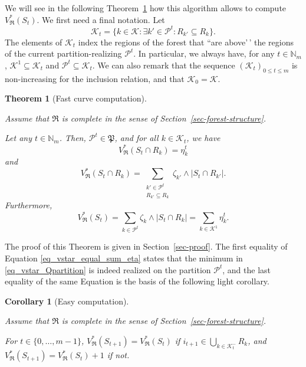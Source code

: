 \documentclass[
  11pt,
  a4paper,
]{article}
\theoremstyle{plain}
\newtheorem{corollary}{Corollary}[section]
\theoremstyle{definition}
\theoremstyle{plain}
\newtheorem{theorem}{Theorem}[section]
\theoremstyle{definition}
\theoremstyle{plain}
\theoremstyle{remark}
\begin{document}
We will see in the following Theorem~\ref{thm-curve-path} how this
algorithm allows to compute \(V^*_{\mathfrak{R}}(S_t)\). We first need a
final notation. Let \begin{equation*}
\mathcal{K}_t=\{k\in\mathcal{K}: \exists k'\in \mathcal{P}^t : R_{k'}\subseteq R_k   \}.
\end{equation*} The elements of \(\mathcal{K}_t\) index the regions of
the forest that ``are above'\,' the regions of the current
partition-realizing \(\mathcal{P}^t\). In particular, we always have,
for any \(t\in\mathbb{N}_m\), \(\mathcal{K}^1\subseteq\mathcal{K}_t\)
and \(\mathcal{P}^t\subseteq \mathcal{K}_t\). We can also remark that
the sequence \((\mathcal{K}_t)_{0\leq t \leq m}\) is non-increasing for
the inclusion relation, and that \(\mathcal{K}_0=\mathcal{K}\).

\begin{theorem}[Fast curve
computation]\protect\hypertarget{thm-curve-path}{}\label{thm-curve-path}

Assume that \(\mathfrak{R}\) is complete in the sense of
Section~\ref{sec-forest-structure}.

Let any \(t\in\mathbb{N}_m\). Then, \(\mathcal{P}^t\in\mathfrak P\), and
for all \(k\in\mathcal{K}_t\), we have \begin{equation}
V^*_{\mathfrak{R}}(S_t\cap R_k) = \eta_k^t
\label{eq_vstar_inter_Rk_equal_eta}
\end{equation} and \begin{equation}
V^*_{\mathfrak{R}}(S_t\cap R_k) = \sum_{\substack{k'\in \mathcal{P}^t\\ R_{k'}\subseteq R_k}} \zeta_{k'}\wedge|S_t \cap R_{k'}|.
\label{eq_Pt_good_partition}
\end{equation} Furthermore, \begin{equation}
V^*_{\mathfrak{R}}(S_t)  = \sum_{{k\in \mathcal{P}^t}} \zeta_{k}\wedge|S_t \cap R_{k}|= \sum_{k\in\mathcal{K}^1} \eta_k^t.
\label{eq_vstar_equal_sum_eta}
\end{equation}

\end{theorem}

The proof of this Theorem is given in Section~\ref{sec-proof}. The first
equality of Equation \eqref{eq_vstar_equal_sum_eta} states that the
minimum in \eqref{eq_vstar_Qpartition} is indeed realized on the
partition \(\mathcal{P}^t\), and the last equality of the same Equation
is the basis of the following light corollary.

\begin{corollary}[Easy
computation]\protect\hypertarget{cor-easy-impl}{}\label{cor-easy-impl}

Assume that \(\mathfrak{R}\) is complete in the sense of
Section~\ref{sec-forest-structure}.

For \(t\in\{0,\dotsc, m-1 \}\),
\(V^*_{\mathfrak{R}}(S_{t+1})=V^*_{\mathfrak{R}}(S_{t})\) if
\(i_{t+1}\in \bigcup_{k\in\mathcal{K}^-_t}R_k\), and
\(V^*_{\mathfrak{R}}(S_{t+1})=V^*_{\mathfrak{R}}(S_{t}) + 1\) if not.

\end{corollary}
\end{document}
